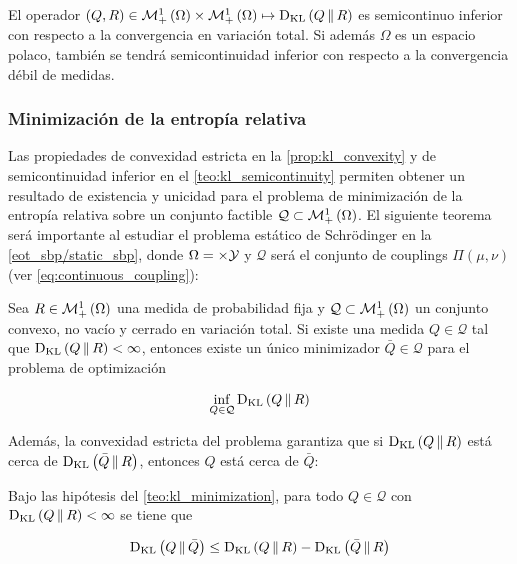 \begin{teo}
	\label{teo:kl_semicontinuity}
	El operador $(Q,R)\in\mathcal{M}_+^1\left(\Omega\right)\times\mathcal{M}_+^1\left(\Omega\right) \mapsto \operatorname{D_{KL}}\left(Q\,\|\,R\right)$ es semicontinuo inferior con respecto a la convergencia en variación total. Si además $\Omega$ es un espacio polaco, también se tendrá semicontinuidad inferior con respecto a la convergencia débil de medidas.
\end{teo}

\subsubsection{Minimización de la entropía relativa}

Las propiedades de convexidad estricta en la \autoref{prop:kl_convexity} y de semicontinuidad inferior en el \autoref{teo:kl_semicontinuity} permiten obtener un resultado de existencia y unicidad para el problema de minimización de la entropía relativa sobre un conjunto factible $\mathcal{Q}\subset \mathcal{M}_+^1\left(\Omega\right)$. El siguiente teorema será importante al estudiar el problema estático de Schrödinger en la \autoref{eot_sbp/static_sbp}, donde $\Omega=\times\mathcal{Y}$ y $\mathcal{Q}$ será el conjunto de couplings $\Pi(\mu,\nu)$ (ver \autoref{eq:continuous_coupling}):

\begin{teo}
	\label{teo:kl_minimization}
	Sea $R\in\mathcal{M}_+^1\left(\Omega\right)$ una medida de probabilidad fija y $\mathcal{Q}\subset \mathcal{M}_+^1\left(\Omega\right)$ un conjunto convexo, no vacío y cerrado en variación total. Si existe una medida $Q\in\mathcal{Q}$ tal que $\operatorname{D_{KL}}\left(Q\,\|\,R\right)<\infty$, entonces existe un único minimizador $\bar Q\in\mathcal{Q}$ para el problema de optimización

	\begin{equation}
		\inf_{Q\in\mathcal{Q}} \operatorname{D_{KL}}\left(Q\,\|\,R\right)
	\end{equation}
\end{teo}

Además, la convexidad estricta del problema garantiza que si $\operatorname{D_{KL}}\left(Q\,\|\,R\right)$ está cerca de $\operatorname{D_{KL}}\left(\bar Q\,\|\,R\right)$, entonces $Q$ está cerca de $\bar Q$:

\begin{prop}
	Bajo las hipótesis del \autoref{teo:kl_minimization}, para todo $Q\in\mathcal{Q}$ con $\operatorname{D_{KL}}\left(Q\,\|\,R\right)<\infty$ se tiene que

	\begin{equation}
		\operatorname{D_{KL}}\left(Q\,\|\,\bar Q\right) \leq \operatorname{D_{KL}}\left(Q\,\|\,R\right) - \operatorname{D_{KL}}\left(\bar Q\,\|\,R\right)
	\end{equation}
\end{prop}

